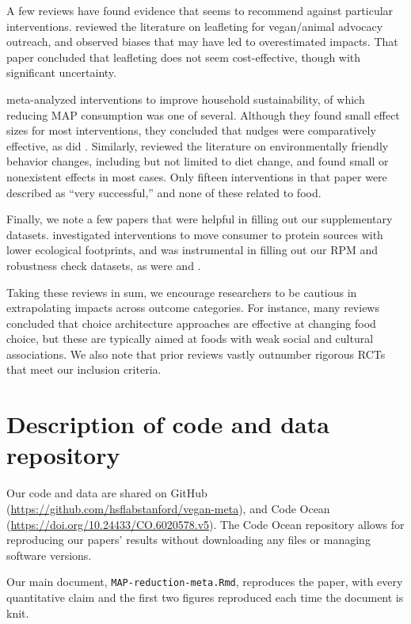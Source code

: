 \documentclass[preprint, 3p,
authoryear]{elsarticle} %
\begin{document}
A few reviews have found evidence that seems to recommend against
particular interventions. \citep{greig2017} reviewed the literature on
leafleting for vegan/animal advocacy outreach, and observed biases that
may have led to overestimated impacts. That paper concluded that
leafleting does not seem cost-effective, though with significant
uncertainty.

\citep{nisa2019} meta-analyzed interventions to improve household
sustainability, of which reducing MAP consumption was one of several.
Although they found small effect sizes for most interventions, they
concluded that nudges were comparatively effective, as did
\citep{ensaff2021}. Similarly, \citep{rau2022} reviewed the literature
on environmentally friendly behavior changes, including but not limited
to diet change, and found small or nonexistent effects in most cases.
Only fifteen interventions in that paper were described as ``very
successful,'' and none of these related to food.

Finally, we note a few papers that were helpful in filling out our
supplementary datasets. \citep{ronto2022} investigated interventions to
move consumer to protein sources with lower ecological footprints, and
was instrumental in filling out our RPM and robustness check datasets,
as were \citep{kwasny2022} and \citep{grummon2023}.

Taking these reviews in sum, we encourage researchers to be cautious in
extrapolating impacts across outcome categories. For instance, many
reviews concluded that choice architecture approaches are effective at
changing food choice, but these are typically aimed at foods with weak
social and cultural associations. We also note that prior reviews vastly
outnumber rigorous RCTs that meet our inclusion criteria.

\section{Description of code and data
repository}\label{description-of-code-and-data-repository}

Our code and data are shared on GitHub
(\url{https://github.com/hsflabstanford/vegan-meta}), and Code Ocean
(\url{https://doi.org/10.24433/CO.6020578.v5}). The Code Ocean
repository allows for reproducing our papers' results without
downloading any files or managing software versions.

Our main document, \texttt{MAP-reduction-meta.Rmd}, reproduces the
paper, with every quantitative claim and the first two figures
reproduced each time the document is knit.
\end{document}
